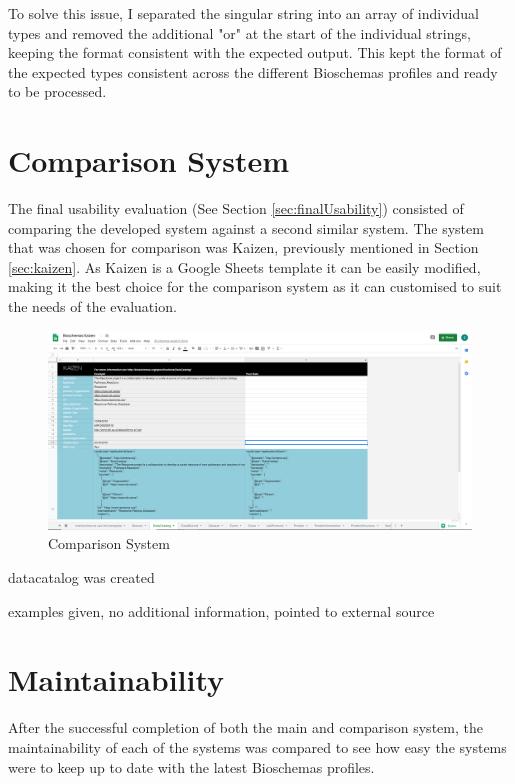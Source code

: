 To solve this issue, I separated the singular string into an array of individual types and removed the additional "or" at the start of the individual strings, keeping the format consistent with the expected output. This kept the format of the expected types consistent across the different Bioschemas profiles and ready to be processed.

\section{Comparison System}\label{sec:comparisonsystem}
The final usability evaluation (See Section \ref{sec:finalUsability}) consisted of comparing the developed system against a second similar system. The system that was chosen for comparison was Kaizen, previously mentioned in Section \ref{sec:kaizen}. As Kaizen is a Google Sheets template it can be easily modified, making it the best choice for the comparison system as it can customised to suit the needs of the evaluation.




\begin{figure}[!h]
 \centering\includegraphics[scale=0.5]{images/system/BioschemasKaizen.PNG}
   \caption{Comparison System}
   \label{fig:comparisonSystem}
\end{figure}


datacatalog was created

examples given, no additional information, pointed to external source

\section{Maintainability}
After the successful completion of both the main and comparison system, the maintainability of each of the systems was compared to see how easy the systems were to keep up to date with the latest Bioschemas profiles.

